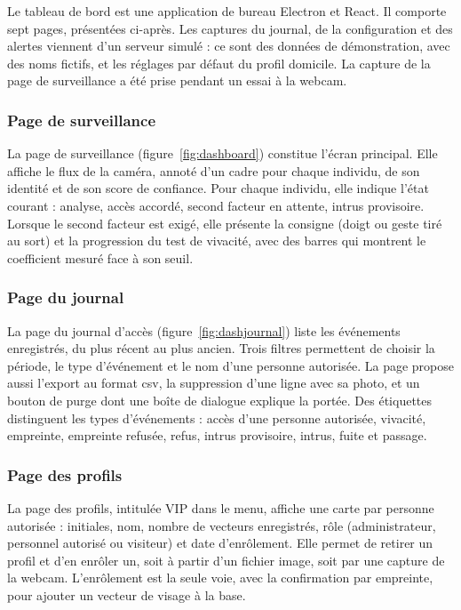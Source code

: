 Le tableau de bord est une application de bureau Electron et React. Il comporte sept pages, présentées ci-après. Les captures du journal, de la configuration et des alertes viennent d'un serveur simulé : ce sont des données de démonstration, avec des noms fictifs, et les réglages par défaut du profil domicile. La capture de la page de surveillance a été prise pendant un essai à la webcam.

\subsubsection{Page de surveillance}

La page de surveillance (figure~\ref{fig:dashboard}) constitue l'écran principal. Elle affiche le flux de la caméra, annoté d'un cadre pour chaque individu, de son identité et de son score de confiance. Pour chaque individu, elle indique l'état courant : analyse, accès accordé, second facteur en attente, intrus provisoire. Lorsque le second facteur est exigé, elle présente la consigne (doigt ou geste tiré au sort) et la progression du test de vivacité, avec des barres qui montrent le coefficient mesuré face à son seuil.

\subsubsection{Page du journal}

La page du journal d'accès (figure~\ref{fig:dashjournal}) liste les événements enregistrés, du plus récent au plus ancien. Trois filtres permettent de choisir la période, le type d'événement et le nom d'une personne autorisée. La page propose aussi l'export au format \gls{csv}, la suppression d'une ligne avec sa photo, et un bouton de purge dont une boîte de dialogue explique la portée. Des étiquettes distinguent les types d'événements : accès d'une personne autorisée, vivacité, empreinte, empreinte refusée, refus, intrus provisoire, intrus, fuite et passage.


\subsubsection{Page des profils}

La page des profils, intitulée VIP dans le menu, affiche une carte par personne autorisée : initiales, nom, nombre de vecteurs enregistrés, rôle (administrateur, personnel autorisé ou visiteur) et date d'enrôlement. Elle permet de retirer un profil et d'en enrôler un, soit à partir d'un fichier image, soit par une capture de la webcam. L'enrôlement est la seule voie, avec la confirmation par empreinte, pour ajouter un vecteur de visage à la base.

